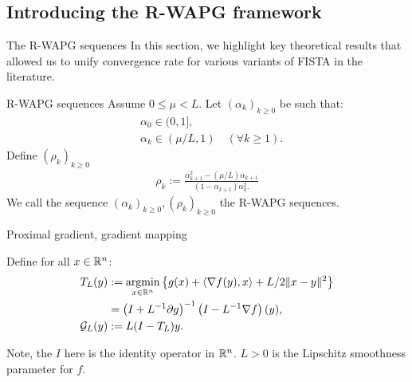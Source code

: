 \documentclass[11pt]{beamer}
\theoremstyle{definition}
\begin{document}
    \subsection{Introducing the R-WAPG framework}
        \begin{frame}{The R-WAPG sequences}
            In this section, we highlight key theoretical results that allowed us to unify convergence rate for various variants of FISTA in the literature.
            \begin{definition}{R-WAPG sequences}\label{def:rwapg-seq}
                Assume $0 \le \mu < L$. 
                Let $(\alpha_k)_{k \ge 0}$ be such that: 
                \begin{align*}
                    & \alpha_0 \in (0, 1], \\
                    & \alpha_k \in (\mu/L, 1) \quad (\forall k \ge 1). 
                \end{align*}    
                Define $(\rho_k)_{k \ge 0}$
                \begin{align*}
                    \rho_k := \frac{\alpha_{k + 1}^2 - (\mu/L) \alpha_{k + 1}}{
                        (1 - \alpha_{k + 1}) \alpha_k^2.
                    }
                \end{align*}
                We call the sequence $(\alpha_k)_{k \ge 0}, (\rho_k)_{k \ge0}$ the R-WAPG sequences. 
            \end{definition}
        \end{frame}
        \begin{frame}{Proximal gradient, gradient mapping}
            \begin{definition}
                Define for all $x\in \mathbb R^n$: 
                \begin{align*}
                    T_L(y) 
                    &:= \mathop{\rm argmin}\limits_{x \in \mathbb R^n} \left\lbrace
                        g(x) + \langle \nabla f(y), x\rangle + L/2\Vert x - y\Vert^2
                    \right\rbrace 
                    \\
                    &= \left(I + L^{-1}\partial g\right)^{-1}
                    \left(I - L^{-1}\nabla f\right)(y),
                    \\
                    \mathcal G_L(y)
                    &:= L(I - T_L)y.
                \end{align*}
            \end{definition}
            Note, the $I$ here is the identity operator in $\mathbb R^n$. 
            $L > 0$ is the Lipschitz smoothness parameter for $f$. 
        \end{frame}
\end{document}
